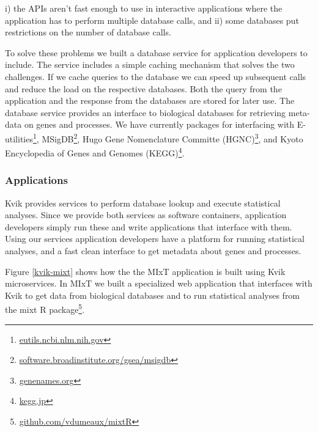 i) the APIs aren't fast enough to use in interactive applications where the
application has to perform multiple database calls, and 
ii) some databases put restrictions on the number of database calls. 

To solve these problems we built a database service for application developers
to include. The service includes a simple caching mechanism that solves the two
challenges. If we cache queries to the database we can speed up subsequent calls
and reduce the load on the respective databases. Both the query from the
application and the response from the databases are stored for later use.
The database service provides an interface to biological databases for
retrieving meta-data on genes and processes. We have currently packages for
interfacing with E-utilities\footnote{\url{eutils.ncbi.nlm.nih.gov}},
MSigDB\footnote{\url{software.broadinstitute.org/gsea/msigdb}}, Hugo Gene
Nomenclature Committe (HGNC)\footnote{\url{genenames.org}}, and Kyoto
Encyclopedia of Genes and Genomes (KEGG)\footnote{\url{kegg.jp}}. 


\subsubsection*{Applications} 
Kvik provides services to perform database lookup and execute statistical
analyses. Since we provide both services as software containers, application
developers simply run these and write applications that interface with them.
Using our services application developers have a platform for running
statistical analyses, and a fast clean interface to get metadata about genes and
processes. 

Figure \ref{kvik-mixt} shows how the the MIxT application is built using Kvik
microservices. In MIxT we built a specialized web application that interfaces
with Kvik to get data from biological databases and to run statistical analyses
from the mixt R package\footnote{\url{github.com/vdumeaux/mixtR}}. 

